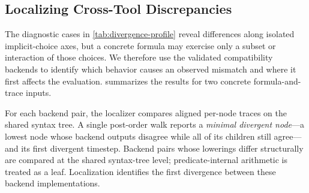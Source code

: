 \begin{table}[t]
\centering
\caption{Mean evaluation time in ms (10 runs) for $N=1$ ($N=256$); ``-c.''
denotes a \tool compatibility backend. RTAMT batches use a Python loop;
STLCG++ uses native \texttt{torch.vmap}.}
\label{tab:scaling-main}
\footnotesize

\end{table}

\subsection{Localizing Cross-Tool Discrepancies}
\label{sec:discrepancies}

The diagnostic cases in \cref{tab:divergence-profile} reveal differences along
isolated implicit-choice axes, but a concrete formula may exercise only a
subset or interaction of those choices. We therefore use the validated
compatibility backends to identify which behavior causes an observed mismatch
and where it first affects the evaluation. 
summarizes the results for two concrete formula-and-trace inputs.

\begin{table}[t]
\centering
\small
\setlength{\tabcolsep}{5pt}
\caption{Pairwise localization using validated compatibility backends. Root
robustness values ($\rho$) follow the tool order; the final column gives their
root-level effect and the minimal divergent node. Formulas appear in
\cref{ex:window-sampling,ex:until-boundary}; \texttt{window\_sampling} is shown
in \cref{fig:e2-window-sampling}.}

\label{tab:e2-localization}
\end{table}

For each backend pair, the localizer compares aligned per-node traces on the
shared syntax tree. A single post-order walk reports a
\emph{minimal divergent node}---a lowest node whose backend
outputs disagree while all of its children still agree---and its first
divergent timestep.
Backend pairs whose lowerings differ structurally are compared at the shared
syntax-tree level; predicate-internal arithmetic is treated as a leaf.
Localization identifies the first divergence between these backend implementations.

